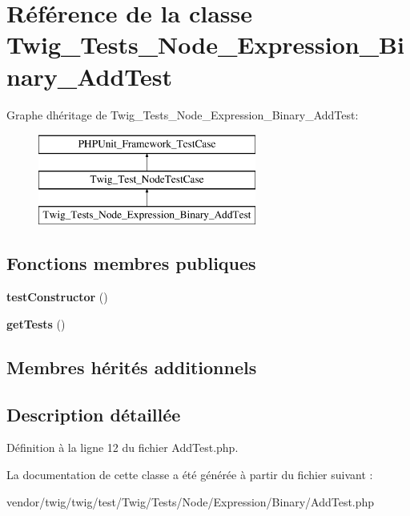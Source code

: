 \hypertarget{class_twig___tests___node___expression___binary___add_test}{}\section{Référence de la classe Twig\+\_\+\+Tests\+\_\+\+Node\+\_\+\+Expression\+\_\+\+Binary\+\_\+\+Add\+Test}
\label{class_twig___tests___node___expression___binary___add_test}
Graphe d\textquotesingle{}héritage de Twig\+\_\+\+Tests\+\_\+\+Node\+\_\+\+Expression\+\_\+\+Binary\+\_\+\+Add\+Test\+:\begin{figure}[H]
\begin{center}
\leavevmode
\includegraphics[height=3.000000cm]{class_twig___tests___node___expression___binary___add_test}
\end{center}
\end{figure}
\subsection*{Fonctions membres publiques}
\begin{DoxyCompactItemize}
\item 
{\bfseries test\+Constructor} ()\hypertarget{class_twig___tests___node___expression___binary___add_test_a47094dc941e72950570900d1418f89c6}{}\label{class_twig___tests___node___expression___binary___add_test_a47094dc941e72950570900d1418f89c6}

\item 
{\bfseries get\+Tests} ()\hypertarget{class_twig___tests___node___expression___binary___add_test_a7e247dd31cc8d37a6c97353a062a0080}{}\label{class_twig___tests___node___expression___binary___add_test_a7e247dd31cc8d37a6c97353a062a0080}

\end{DoxyCompactItemize}
\subsection*{Membres hérités additionnels}


\subsection{Description détaillée}


Définition à la ligne 12 du fichier Add\+Test.\+php.



La documentation de cette classe a été générée à partir du fichier suivant \+:\begin{DoxyCompactItemize}
\item 
vendor/twig/twig/test/\+Twig/\+Tests/\+Node/\+Expression/\+Binary/Add\+Test.\+php\end{DoxyCompactItemize}
